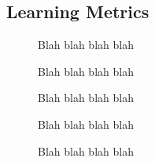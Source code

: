 \documentclass[../main.tex]{subfiles}
\begin{document}
\subsection{Learning Metrics}

\begin{figure}[H]
    \caption{Blah blah blah blah}\label{fig:behavior}
\end{figure}


\begin{figure}[H]
    \caption{Blah blah blah blah}\label{fig:behavior}
\end{figure}


\begin{figure}[H]
    \caption{Blah blah blah blah}\label{fig:behavior}
\end{figure}


\begin{figure}[H]
    \caption{Blah blah blah blah}\label{fig:behavior}
    \end{figure}


\begin{figure}[H]
    \caption{Blah blah blah blah}\label{fig:behavior}
\end{figure}
\end{document}
